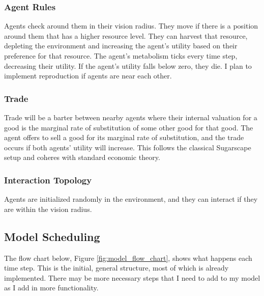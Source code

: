 \documentclass{article}
\begin{document}
\subsubsection{Agent Rules}
Agents check around them in their vision radius. They move if there is a position around them that has a higher resource level. They can harvest that resource, depleting the environment and increasing the agent's utility based on their preference for that resource. The agent's metabolism ticks every time step, decreasing their utility. If the agent's utility falls below zero, they die. I plan to implement reproduction if agents are near each other. 
\subsubsection{Trade}
Trade will be a barter between nearby agents where their internal valuation for a good is the marginal rate of substitution of some other good for that good. The agent offers to sell a good for its marginal rate of substitution, and the trade occurs if both agents' utility will increase. This follows the classical Sugarscape setup and coheres with standard economic theory. 

\subsubsection{Interaction Topology}
Agents are initialized randomly in the environment, and they can interact if they are within the vision radius. 



\subsection{Model Scheduling}

The flow chart below, Figure \ref{fig:model_flow_chart}, shows what happens each time step. This is the initial, general structure, most of which is already implemented. There may be more necessary steps that I need to add to my model as I add in more functionality. 
\end{document}
